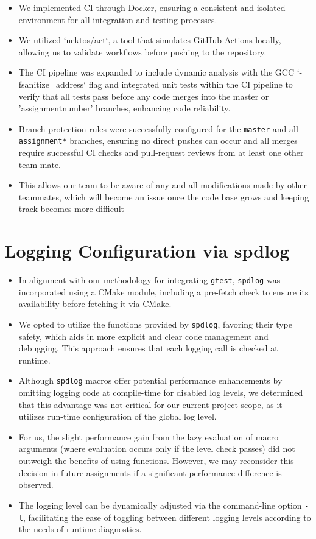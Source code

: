\documentclass{article}
\begin{document}
\begin{itemize}
    \item We implemented CI through Docker, ensuring a consistent and isolated environment for all integration and testing processes.
    \item We utilized `nektos/act`, a tool that simulates GitHub Actions locally, allowing us to validate workflows before pushing to the repository.
    \item The CI pipeline was expanded to include dynamic analysis with the GCC `-fsanitize=address` flag and integrated unit tests within the CI pipeline to verify that all tests pass before any code merges into the master or 'assignment{number}' branches, enhancing code reliability.
    \item Branch protection rules were successfully configured for the \verb|master| and all \verb|assignment*| branches, ensuring no direct pushes can occur and all merges require successful CI checks and pull-request reviews from at least one other team mate.
    \item This allows our team to be aware of any and all modifications made by other teammates, which will become an issue once the code base grows and keeping track becomes more difficult
\end{itemize}

\section{Logging Configuration via spdlog}
\label{sec:spd}

\begin{itemize}
    \item In alignment with our methodology for integrating \verb|gtest|, \verb|spdlog| was incorporated using a CMake module, including a pre-fetch check to ensure its availability before fetching it via CMake.
    \item We opted to utilize the functions provided by \verb|spdlog|, favoring their type safety, which aids in more explicit and clear code management and debugging. This approach ensures that each logging call is checked at runtime.
    \item Although \verb|spdlog| macros offer potential performance enhancements by omitting logging code at compile-time for disabled log levels, we determined that this advantage was not critical for our current project scope, as it utilizes run-time configuration of the global log level.
    \item For us, the slight performance gain from the lazy evaluation of macro arguments (where evaluation occurs only if the level check passes) did not outweigh the benefits of using functions. However, we may reconsider this decision in future assignments if a significant performance difference is observed.
    \item The logging level can be dynamically adjusted via the command-line option \texttt{-l}, facilitating the ease of toggling between different logging levels according to the needs of runtime diagnostics.
\end{itemize}
\end{document}
